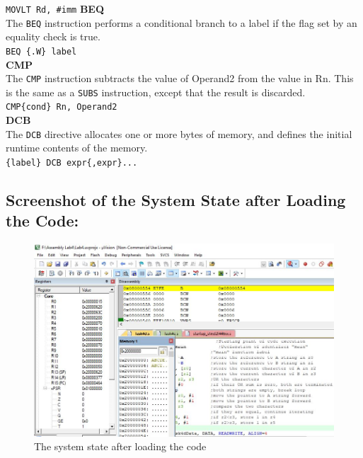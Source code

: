 \documentclass[12pt]{article}
\begin{document}
\verb|MOVLT Rd, #imm|
\textbf{BEQ}\\
The \verb|BEQ| instruction performs a conditional branch to a label if the flag set by an equality check is true.\\
\verb|BEQ {.W} label|\\
\textbf{CMP}\\
The \verb|CMP| instruction subtracts the value of Operand2 from the value in Rn. This is the same as a \verb|SUBS| instruction, except that the result is discarded.\\
\verb|CMP{cond} Rn, Operand2|\\
\textbf{DCB}\\
The \verb|DCB| directive allocates one or more bytes of memory, and defines the initial runtime contents of the memory.\\
\verb|{label} DCB expr{,expr}...|\\
\pagebreak
\subsection{Screenshot of the System State after Loading the Code:}
\begin{figure}[ht]
     \centering
     \includegraphics[scale=.7]{images/beforetask4d.JPG}
     \caption{The system state after loading the code}
     \label{fig:before_task_four_d}
 \end{figure}
 \pagebreak
\end{document}
